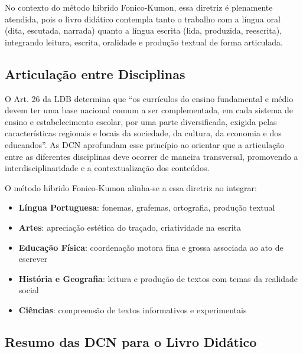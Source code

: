 No contexto do método híbrido Fonico-Kumon, essa diretriz é plenamente atendida, pois o livro didático contempla tanto o trabalho com a língua oral (dita, escutada, narrada) quanto a língua escrita (lida, produzida, reescrita), integrando leitura, escrita, oralidade e produção textual de forma articulada.

\subsection{Articulação entre Disciplinas}

O Art. 26 da LDB determina que ``os currículos do ensino fundamental e médio devem ter uma base nacional comum a ser complementada, em cada sistema de ensino e estabelecimento escolar, por uma parte diversificada, exigida pelas características regionais e locais da sociedade, da cultura, da economia e dos educandos''. As DCN aprofundam esse princípio ao orientar que a articulação entre as diferentes disciplinas deve ocorrer de maneira transversal, promovendo a interdisciplinaridade e a contextualização dos conteúdos.

O método híbrido Fonico-Kumon alinha-se a essa diretriz ao integrar:

\begin{itemize}[leftmargin=2cm]
  \item \textbf{Língua Portuguesa}: fonemas, grafemas, ortografia, produção textual
  \item \textbf{Artes}: apreciação estética do traçado, criatividade na escrita
  \item \textbf{Educação Física}: coordenação motora fina e grossa associada ao ato de escrever
  \item \textbf{História e Geografia}: leitura e produção de textos com temas da realidade social
  \item \textbf{Ciências}: compreensão de textos informativos e experimentais
\end{itemize}

\subsection{Resumo das DCN para o Livro Didático}

